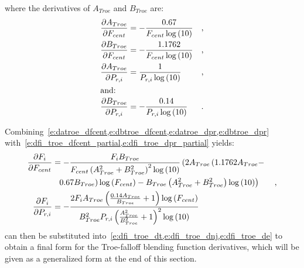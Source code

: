 \documentclass[12pt,number,sort&compress]{elsarticle}
\begin{document}
where the derivatives of $A_{Troe}$ and $B_{Troe}$ are:
\begin{align}
 \frac{\partial A_{Troe} }{\partial F_{cent} } &= - \frac{0.67}{F_{cent} \log{\left (10 \right )}} & \text{,} \label{e:datroe_dfcent} \\
\frac{\partial B_{Troe} }{\partial F_{cent} } &= - \frac{1.1762}{F_{cent} \log{\left (10 \right )}} & \text{,} \label{e:dbtroe_dfcent} \\
\frac{\partial A_{Troe} }{\partial P_{r, i} } &= \frac{1}{P_{r, i} \log{\left (10 \right )}} & \text{,} \label{e:datroe_dpr} \\
\intertext{and:}
\frac{\partial B_{Troe} }{\partial P_{r, i} } &= - \frac{0.14}{P_{r, i} \log{\left (10 \right )}} & \text{.} \label{e:dbtroe_dpr} \\
\end{align}

Combining~\cref{e:datroe_dfcent,e:dbtroe_dfcent,e:datroe_dpr,e:dbtroe_dpr} with~\cref{e:dfi_troe_dfcent_partial,e:dfi_troe_dpr_partial} yields:
\begin{align}
\frac{\partial F_{i} }{\partial F_{cent} } &= - \frac{F_{i} B_{Troe}}{F_{cent} \left(A_{Troe}^{2} + B_{Troe}^{2}\right)^{2} \log{\left (10 \right )}} \left(2 A_{Troe} \left( 1.1762 A_{Troe} - \right. \right . & \nonumber \\
& \mathindent[s] \left. \left. 0.67 B_{Troe}\right) \log{\left (F_{cent} \right )} - B_{Troe} \left(A_{Troe}^{2} + B_{Troe}^{2}\right) \log{\left (10 \right )}\right) & \text{,} \label{e:dfi_troe_dfcent} \\
\frac{\partial F_{i} }{\partial P_{r, i} } &= - \frac{2 F_{i} A_{Troe} \left(\frac{0.14 A_{Troe}}{B_{Troe}} + 1\right) \log{\left (F_{cent} \right )}}{B_{Troe}^{2} P_{r, i} \left(\frac{A_{Troe}^{2}}{B_{Troe}^{2}} + 1\right)^{2} \log{\left (10 \right )}} \label{e:dfi_troe_dpr} &
\end{align}
 can then be substituted into~\cref{e:dfi_troe_dt,e:dfi_troe_dnj,e:dfi_troe_de} to obtain a final form for the Troe-falloff blending function derivatives, which will be given as a generalized form at the end of this section.
\end{document}
